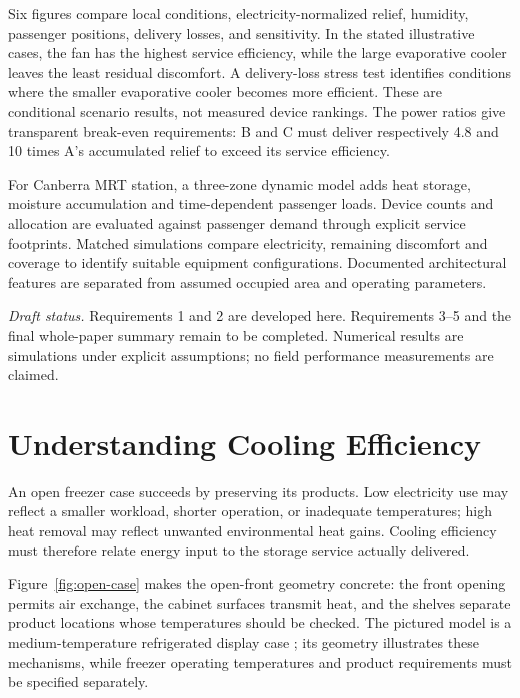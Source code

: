 \documentclass[12pt]{article}
\begin{document}
Six figures compare local conditions, electricity-normalized relief, humidity, passenger positions, delivery losses, and sensitivity. In the stated illustrative cases, the fan has the highest service efficiency, while the large evaporative cooler leaves the least residual discomfort. A delivery-loss stress test identifies conditions where the smaller evaporative cooler becomes more efficient. These are conditional scenario results, not measured device rankings. The power ratios give transparent break-even requirements: B and C must deliver respectively 4.8 and 10 times A's accumulated relief to exceed its service efficiency.

For Canberra MRT station, a three-zone dynamic model adds heat storage, moisture accumulation and time-dependent passenger loads. Device counts and allocation are evaluated against passenger demand through explicit service footprints. Matched simulations compare electricity, remaining discomfort and coverage to identify suitable equipment configurations. Documented architectural features are separated from assumed occupied area and operating parameters.

\medskip
\noindent\textit{Draft status.} Requirements 1 and 2 are developed here. Requirements 3--5 and the final whole-paper summary remain to be completed. Numerical results are simulations under explicit assumptions; no field performance measurements are claimed.

\clearpage
\pagestyle{fancy}
\tableofcontents
\clearpage

\section{Understanding Cooling Efficiency}
\label{sec:understand}

An open freezer case succeeds by preserving its products. Low electricity use may reflect a smaller workload, shorter operation, or inadequate temperatures; high heat removal may reflect unwanted environmental heat gains. Cooling efficiency must therefore relate energy input to the storage service actually delivered.


Figure~\ref{fig:open-case} makes the open-front geometry concrete: the front opening permits air exchange, the cabinet surfaces transmit heat, and the shelves separate product locations whose temperatures should be checked. The pictured model is a medium-temperature refrigerated display case \cite{hillphoenix}; its geometry illustrates these mechanisms, while freezer operating temperatures and product requirements must be specified separately.
\end{document}
